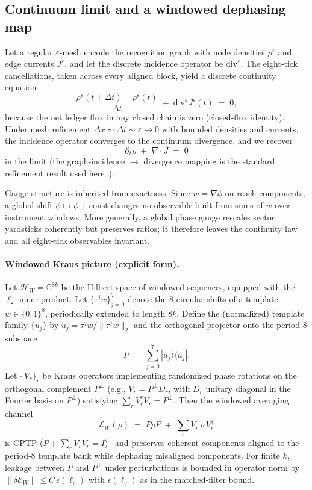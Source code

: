 \documentclass[12pt,a4paper]{article}
\theoremstyle{definition}
\theoremstyle{remark}
\begin{document}
\subsection{Continuum limit and a windowed dephasing map}
\label{sec:continuum}

Let a regular \(\varepsilon\)-mesh encode the recognition graph with node densities \(\rho^\varepsilon\) and edge currents \(J^\varepsilon\), and let the discrete incidence operator be \(\mathrm{div}^\varepsilon\). The eight‑tick cancellations, taken across every aligned block, yield a discrete continuity equation
\[
\frac{\rho^\varepsilon(t+\Delta t)-\rho^\varepsilon(t)}{\Delta t}\;+\;\mathrm{div}^\varepsilon J^\varepsilon(t)\;=\;0,
\]
because the net ledger flux in any closed chain is zero (closed‑flux identity). Under mesh refinement \(\Delta x\sim \Delta t\sim \varepsilon\to 0\) with bounded densities and currents, the incidence operator converges to the continuum divergence, and we recover
\[
\partial_t \rho\;+\;\nabla\!\cdot J\;=\;0
\]
in the limit (the graph‑incidence \(\to\) divergence mapping is the standard refinement result used here~\cite{Hirani2003,Desbrun2008}).

Gauge structure is inherited from exactness. Since \(w=\nabla\phi\) on reach components, a global shift \(\phi\mapsto \phi+\mathrm{const}\) changes no observable built from sums of \(w\) over instrument windows. More generally, a global phase gauge rescales sector yardsticks coherently but preserves ratios; it therefore leaves the continuity law and all eight‑tick observables invariant.

\paragraph{Windowed Kraus picture (explicit form).}
Let \(\mathcal{H}_W=\mathbb{C}^{8k}\) be the Hilbert space of windowed sequences, equipped with the \(\ell_2\) inner product. Let \(\{\tau^j w\}_{j=0}^{7}\) denote the 8 circular shifts of a template \(w\in\{0,1\}^8\), periodically extended to length \(8k\). Define the (normalized) template family \(\{u_j\}\) by \(u_j=\tau^j w/\|\tau^j w\|_2\) and the orthogonal projector onto the period‑8 subspace
\[
 P\;=\;\sum_{j=0}^{7} |u_j\rangle\langle u_j|.
\]
Let \(\{V_r\}_{r}\) be Kraus operators implementing randomized phase rotations on the orthogonal complement \(P^\perp\) (e.g., \(V_r=P^\perp D_r\), with \(D_r\) unitary diagonal in the Fourier basis on \(P^\perp\)) satisfying \(\sum_r V_r^\dagger V_r=P^\perp\). Then the windowed averaging channel
\[
 \mathcal{E}_W(\rho)\;=\; P\rho P\;+\;\sum_r V_r\,\rho\,V_r^\dagger
\]
is CPTP (\(P+\sum_r V_r^\dagger V_r=I\))~\cite{Kraus1971,NielsenChuang2010} and preserves coherent components aligned to the period‑8 template bank while dephasing misaligned components. For finite \(k\), leakage between \(P\) and \(P^\perp\) under perturbations is bounded in operator norm by \(\|\delta\mathcal{E}_W\|\le C\,\epsilon(\ell_c)\) with \(\epsilon(\ell_c)\) as in the matched‑filter bound.
\end{document}
